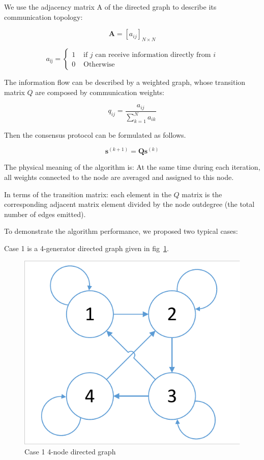 \documentclass[conference]{IEEEtran}
\begin{document}
We use the adjacency matrix A of the directed graph to describe its communication topology:

\begin{equation}
    \mathbf{A}=\left[a_{i j}\right]_{N \times N}
\end{equation}

\begin{equation}
    a_{\mathrm{ij}}=\left\{\begin{array}{ll}
    {1} & {\text { if } j \text{ can receive information directly from } i } \\
    {0} & {\text { Otherwise }}
    \end{array}\right.
\end{equation}

The information flow can be described by a weighted graph, whose transition matrix $Q$ are composed by communication weights:

\begin{equation}
    q_{i j}=\frac{a_{i j}}{\sum_{k=1}^{N} a_{i k}}
\end{equation}

Then the consensus protocol can be formulated as follows.

\begin{equation}\boldsymbol{s}^{(k+1)}=\boldsymbol{Q} \boldsymbol{s}^{(k)}\end{equation}

The physical meaning of the algorithm is: At the same time during each iteration, all weights connected to the node are averaged and assigned to this node.

In terms of the transition matrix: each element in the $Q$ matrix is the corresponding adjacent matrix element divided by the node outdegree (the total number of edges emitted).

To demonstrate the algorithm performance, we proposed two typical cases:

Case 1 is a 4-generator directed graph given in fig~\ref{fig:Directed-graph}.

\begin{figure}[htbp] %
    \centering
    \includegraphics[width=0.8\columnwidth]{Directed-graph.pdf}
    \caption{Case 1 4-node directed graph}
    \label{fig:Directed-graph}
\end{figure}
\end{document}
